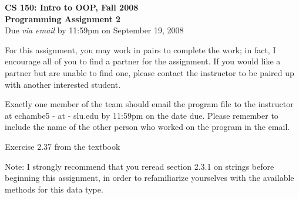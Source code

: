 \documentclass[11pt]{article}
\begin{document}

\begin{center}
\LARGE \textbf{CS 150: Intro to OOP, Fall 2008}
\\
\textbf{Programming Assignment 2}
\\[1ex]
\Large Due \emph{via email} by 11:59pm on September 19, 2008\\

\end{center}

For this assignment, you may work in pairs to complete the work; in
fact, I encourage all of you to find a partner for the assignment.
If you would like a partner but are unable to find one, please
contact the instructor to be paired up with another interested
student.

Exactly one member of the team should email the program file to the
instructor at echambe5 - at - slu.edu by 11:59pm on the date due.
Please remember to include the name of the other person who worked
on the program in the email.

\begin{problems}
\item Exercise 2.37 from the textbook

\noindent Note: I strongly recommend that you reread section 2.3.1
on strings before beginning this assignment, in order to
refamiliarize yourselves with the available methods for this data
type.

\end{problems}
\end{document}
